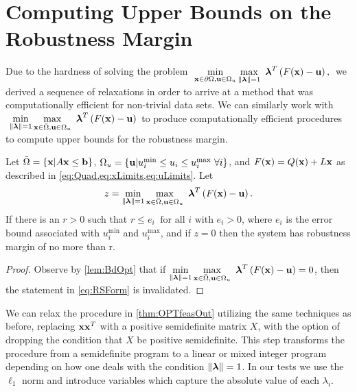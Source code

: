 \section{Computing Upper Bounds on the Robustness Margin} \label{sec:outbdform}  

Due to the hardness of solving the problem $~\displaystyle \min\limits_{\vx\in \partial \Omega, \vu\in\Omega_u}\max\limits_{\norm{\vlambda}=1 }\ \vlambda^T\left(F(\vx)-\vu\right),\,$ we derived a sequence of relaxations in order to arrive at a method that was computationally efficient for non-trivial data sets. 
We can similarly work with $~\displaystyle \min\limits_{\lVert\boldsymbol{\lambda}\rVert=1}\max\limits_{\mathbf{x}\in \bar{\Omega}, \mathbf{u}\in\Omega_u}\ \boldsymbol{\lambda}^T\left(F(\mathbf{x})-\mathbf{u}\right) \,$ to produce computationally efficient procedures to compute upper bounds for the robustness margin. 

\bigskip
\begin{thm}\label{thm:OPTfeasOut} 
Let $\bar{\Omega}=\{\mathbf{x}| A\mathbf{x}\leq \mathbf{b}\}$, $\Omega_{u}=\{\mathbf{u}| u^{\min}_i\leq u_i \leq u^{\max}_i \ \forall i \}$, and $F(\mathbf{x})=Q(\mathbf{x})+L\mathbf{x}$ as described in \cref{eq:Quad,eq:xLimits,eq:uLimits}. 
Let
\[
  z = \min\limits_{\lVert\boldsymbol{\lambda}\rVert=1}\max\limits_{\mathbf{x}\in \bar{\Omega}, \mathbf{u}\in\Omega_u}\ \boldsymbol{\lambda}^T\left(F(\mathbf{x})-\mathbf{u}\right).
\]
If there is an $r>0$ such that $r \leq e_i \ \mbox{ for all } i \mbox{ with } e_i>0$, where $e_i$ is the error bound associated with $ u^{\min}_i$ and $ u^{\max}_i$, and if $z=0$ then the system has robustness margin of no more than r.

\medskip
\begin{proof} 
  Observe by \cref{lem:BdOpt} that if $\min\limits_{\norm{\vlambda}=1}\max\limits_{\vx\in \bar{\Omega}, \vu \in \Omega_u}\ \vlambda^T\left(F(\vx)-\vu\right)=0$, then the statement in \cref{eq:RSForm} is invalidated.  
%
\end{proof}
\end{thm}

\bigskip
We can relax the procedure in \cref{thm:OPTfeasOut} utilizing the same techniques as before, replacing $\mathbf{x}\mathbf{x}^T$ with a positive semidefinite matrix $X$, with the option of dropping the condition that $X$ be positive semidefinite.
This step transforms the procedure from a semidefinite program to a linear or mixed integer program depending on how one deals with the condition $\lVert\boldsymbol{\lambda}\rVert=1$. 
In our tests we use the $\ell_1$ norm and introduce variables which capture the absolute value of each $\lambda_i$.

